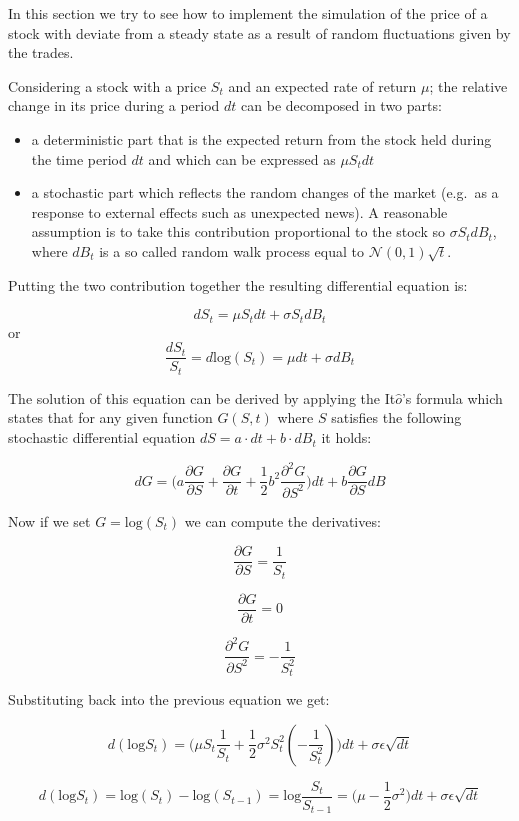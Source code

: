 In this section we try to see how to implement the simulation of the price of a stock with deviate from a steady state as a result of random fluctuations given by the trades. 

Considering a stock with a price \(S_t\) and an expected rate of return \(\mu\); the relative change
in its price during a period \(dt\) can be decomposed in two parts:

\begin{itemize}
\tightlist
\item
  a deterministic part that is the expected return from the stock held
  during the time period \(dt\) and which can be expressed as \(\mu S_tdt\)
\item
  a stochastic part which reflects the random changes of the market
  (e.g.~as a response to external effects such as unexpected news). A
  reasonable assumption is to take this contribution proportional to the
  stock so \(\sigma S_t dB_t\), where \(dB_t\) is a so called random walk process
  equal to \(\mathcal{N}(0,1)\sqrt{t}\).
\end{itemize}
Putting the two contribution together the resulting differential equation is:

\[dS_t = \mu S_tdt + \sigma S_tdB_t\] or
\[\frac{dS_t}{S_t} = d\textrm{log}(S_t) = \mu dt + \sigma dB_t\]

    The solution of this equation can be derived by applying the
It\(\hat{o}\)'s formula which states that for any given function
\(G(S, t)\) where \(S\) satisfies the following stochastic differential
equation \(dS=a\cdot dt +b\cdot dB_t\) it holds:

\[dG=\big(a\frac{\partial G}{\partial S} + \frac{\partial G}{\partial t} + \frac{1}{2}b^2\frac{\partial^2 G}{\partial S^2} \big)dt + b \frac{\partial G}{\partial S}dB\]

Now if we set \(G = \textrm{log}(S_t)\) we can compute the derivatives:

\[\frac{\partial G}{\partial S} = \frac{1}{S_t}\]

\[\frac{\partial G}{\partial t} = 0\]

\[\frac{\partial^2 G}{\partial S^2} = -\frac{1}{S_t^{2}}\]

Substituting back into the previous equation we get:

\[d(\textrm{log} S_t) = \big(\mu S_t \frac{1}{S_t} + \frac{1}{2}\sigma^2 S_t^2 (-\frac{1}{S_t^2})\big)dt + \sigma\epsilon\sqrt{dt}\]

\[d(\textrm{log} S_t) = \textrm{log} (S_t) - \textrm{log} (S_{t-1}) = \textrm{log} \frac{S_t}{S_{t-1}} = \big(\mu - \frac{1}{2}\sigma^2\big)dt + \sigma\epsilon\sqrt{dt}\]

